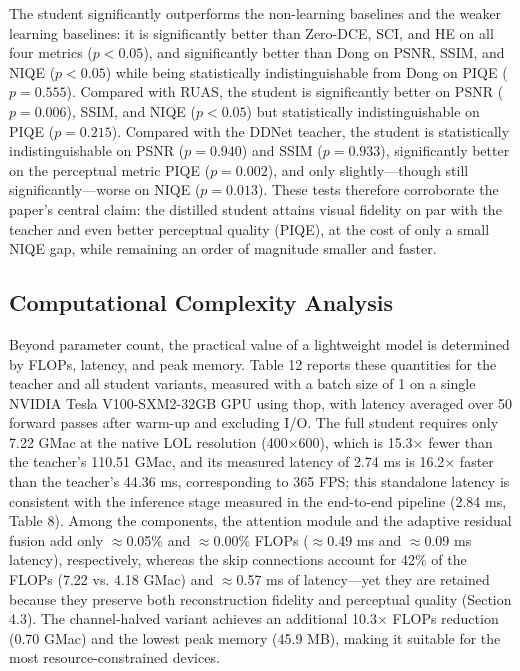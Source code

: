 \documentclass[sensors,article,submit,moreauthors]{Definitions/mdpi}
\begin{document}
The student significantly outperforms the non-learning baselines and the weaker learning baselines: it is significantly better than Zero-DCE, SCI, and HE on all four metrics ($p < 0.05$), and significantly better than Dong on PSNR, SSIM, and NIQE ($p < 0.05$) while being statistically indistinguishable from Dong on PIQE ($p = 0.555$). Compared with RUAS, the student is significantly better on PSNR ($p = 0.006$), SSIM, and NIQE ($p < 0.05$) but statistically indistinguishable on PIQE ($p = 0.215$). Compared with the DDNet teacher, the student is statistically indistinguishable on PSNR ($p = 0.940$) and SSIM ($p = 0.933$), significantly better on the perceptual metric PIQE ($p = 0.002$), and only slightly---though still significantly---worse on NIQE ($p = 0.013$). These tests therefore corroborate the paper's central claim: the distilled student attains visual fidelity on par with the teacher and even better perceptual quality (PIQE), at the cost of only a small NIQE gap, while remaining an order of magnitude smaller and faster.

\subsection{Computational Complexity Analysis}

Beyond parameter count, the practical value of a lightweight model is determined by FLOPs, latency, and peak memory. Table 12 reports these quantities for the teacher and all student variants, measured with a batch size of 1 on a single NVIDIA Tesla V100-SXM2-32GB GPU using thop, with latency averaged over 50 forward passes after warm-up and excluding I/O. The full student requires only 7.22 GMac at the native LOL resolution (400$\times$600), which is 15.3$\times$ fewer than the teacher's 110.51 GMac, and its measured latency of 2.74 ms is 16.2$\times$ faster than the teacher's 44.36 ms, corresponding to 365 FPS; this standalone latency is consistent with the inference stage measured in the end-to-end pipeline (2.84 ms, Table 8). Among the components, the attention module and the adaptive residual fusion add only $\approx$0.05\% and $\approx$0.00\% FLOPs ($\approx$0.49 ms and $\approx$0.09 ms latency), respectively, whereas the skip connections account for 42\% of the FLOPs (7.22 vs. 4.18 GMac) and $\approx$0.57 ms of latency---yet they are retained because they preserve both reconstruction fidelity and perceptual quality (Section 4.3). The channel-halved variant achieves an additional 10.3$\times$ FLOPs reduction (0.70 GMac) and the lowest peak memory (45.9 MB), making it suitable for the most resource-constrained devices.
\end{document}

